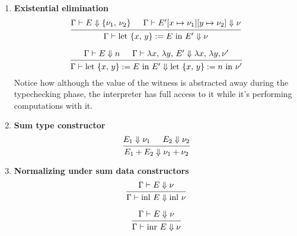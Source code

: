 \documentclass{article}
\begin{document}
\begin{enumerate}
  \item \textbf{Existential elimination} \\
    \[
      \begin{prooftree}
        \hypo{\Gamma \vdash E \Downarrow \{\nu_1, \, \nu_2\}}
        \hypo{\Gamma \vdash E'[x \mapsto \nu_1][y \mapsto \nu_2] \Downarrow \nu}
        \infer2{\Gamma \vdash \text{let } \{x, \, y\} := E \text{ in } E' \Downarrow \nu}
      \end{prooftree}
    \]

   \[
      \begin{prooftree}
        \hypo{\Gamma \vdash E \Downarrow n}
        \hypo{\Gamma \vdash \lambda x, \, \lambda y, \, E' \Downarrow \lambda x, \, \lambda y, \nu'}
        \infer2{\Gamma \vdash \text{let } \{x, \, y\} := E \text{ in } E' \Downarrow
                \text{let } \{x, \, y\} := n \text{ in } \nu'}
      \end{prooftree}
    \]
    Notice how although the value of the witness is abstracted away during the
    typechecking phase, the interpreter has full access to it while it's
    performing computations with it.


  \item \textbf{Sum type constructor}
  \[
    \begin{prooftree}
      \hypo{E_1 \Downarrow \nu_1}
      \hypo{E_2 \Downarrow \nu_2}
      \infer2{E_1 + E_2 \Downarrow \nu_1 + \nu_2}
    \end{prooftree}
  \]

  \item \textbf{Normalizing under sum data constructors}
  \[
    \begin{prooftree}
      \hypo{\Gamma \vdash E \Downarrow \nu}
      \infer1{\Gamma \vdash \inl \, E \Downarrow \inl \, \nu}
    \end{prooftree}  
  \]

  \[
    \begin{prooftree}
     \hypo{\Gamma \vdash E \Downarrow \nu}
     \infer1{\Gamma \vdash \inr \, E \Downarrow \nu}
    \end{prooftree}  
  \]


\end{enumerate}
\end{document}
